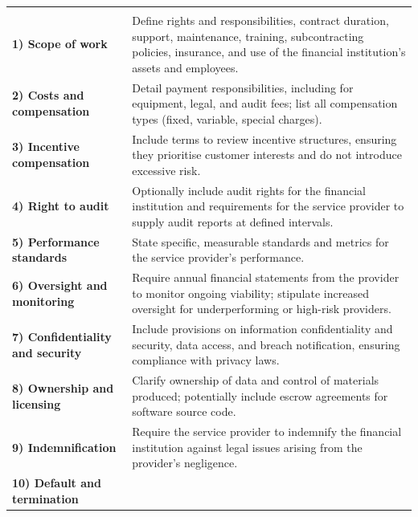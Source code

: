\noindent\begin{minipage}{\textwidth}
\renewcommand{\arraystretch}{1.3}
\begin{tabularx}{\textwidth}{@{}L{0.27\textwidth}Y@{}}
  & \\
{\tabfont \textbf{1) Scope of work}} &
{\tabfont Define rights and responsibilities, contract duration, support,
maintenance, training, subcontracting policies, insurance, and use of the
financial institution's assets and employees.}\\
{\tabfont \textbf{2) Costs and compensation}} &
{\tabfont Detail payment responsibilities, including for equipment, legal, and
audit fees; list all compensation types (fixed, variable, special charges).}\\
{\tabfont \textbf{3) Incentive compensation}} &
{\tabfont Include terms to review incentive structures, ensuring they prioritise
customer interests and do not introduce excessive risk.}\\
{\tabfont \textbf{4) Right to audit}} &
{\tabfont Optionally include audit rights for the financial institution and
requirements for the service provider to supply audit reports at defined
intervals.}\\
{\tabfont \textbf{5) Performance standards}} &
{\tabfont State specific, measurable standards and metrics for the service
provider's performance.}\\
{\tabfont \textbf{6) Oversight and monitoring}} &
{\tabfont Require annual financial statements from the provider to monitor
ongoing viability; stipulate increased oversight for underperforming or high-risk
providers.}\\
{\tabfont \textbf{7) Confidentiality and security}} &
{\tabfont Include provisions on information confidentiality and security, data
access, and breach notification, ensuring compliance with privacy laws.}\\
{\tabfont \textbf{8) Ownership and licensing}} &
{\tabfont Clarify ownership of data and control of materials produced; potentially
include escrow agreements for software source code.}\\
{\tabfont \textbf{9) Indemnification}} &
{\tabfont Require the service provider to indemnify the financial institution
against legal issues arising from the provider's negligence.}\\
{\tabfont \textbf{10) Default and termination}} &

\end{tabularx}
\end{minipage}
